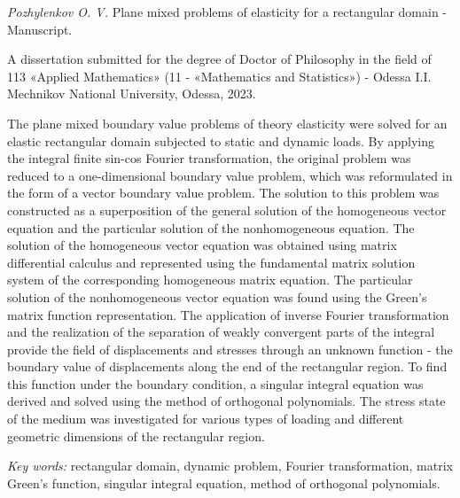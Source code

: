 \textit{Pozhylenkov O. V.}
Plane mixed problems of elasticity for a rectangular domain - Manuscript.

A dissertation submitted for the degree of Doctor of Philosophy in the field of 113 «Applied Mathematics» (11 - «Mathematics and Statistics») - Odessa I.I. Mechnikov National University, Odessa, 2023.

The plane mixed boundary value problems of theory elasticity were solved for an elastic rectangular domain subjected to static and dynamic loads.
By applying the integral finite sin-cos Fourier transformation, the original problem was reduced to a one-dimensional boundary value problem, which was reformulated in the form of a vector boundary value problem.
The solution to this problem was constructed as a superposition of the general solution of the homogeneous vector equation and the particular solution of the nonhomogeneous equation.
The solution of the homogeneous vector equation was obtained using matrix differential calculus and represented using the fundamental matrix solution system of the corresponding homogeneous matrix equation.
The particular solution of the nonhomogeneous vector equation was found using the Green's matrix function representation.
The application of inverse Fourier transformation and the realization of the separation of weakly convergent parts of the integral provide the field of displacements and stresses through an unknown function - the boundary value of displacements along the end of the rectangular region.
To find this function under the boundary condition, a singular integral equation was derived and solved using the method of orthogonal polynomials.
The stress state of the medium was investigated for various types of loading and different geometric dimensions of the rectangular region.

\textit{Key words:}
rectangular domain, dynamic problem, Fourier transformation, matrix Green's function, singular integral equation, method of orthogonal polynomials.